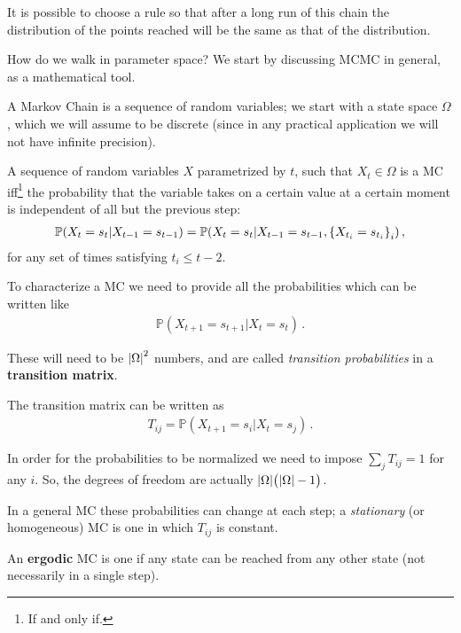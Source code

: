 \documentclass[main.tex]{subfiles}
\begin{document}
It is possible to choose a rule so that after a long run of this chain the distribution of the points reached will be the same as that of the distribution. 

How do we walk in parameter space?
We start by discussing MCMC in general, as a mathematical tool.

A Markov Chain is a sequence of random variables; 
we start with a state space \(\Omega \), which we will assume to be discrete (since in any practical application we will not have infinite precision).

A sequence of random variables \(X\) parametrized by \(t\), such that \(X_t \in \Omega \) is a MC iff\footnote{If and only if.} the probability that the variable takes on a certain value at a certain moment is independent of all but the previous step:
%
\begin{align}
\mathbb{P}(X_t = s_t | X_{t-1} = s_{t-1})
= \mathbb{P}(X_t = s_t |X_{t-1} = s_{t-1}, \qty{ X_{t_i} = s_{t_i}}_i)
\,,
\end{align}
%
for any set of times satisfying \(t_i \leq t-2\). 

To characterize a MC we need to provide all the probabilities which can be written like 
%
\begin{align}
\mathbb{P}(X_{t+1} = s_{t+1} | X_t = s_t)
\,.
\end{align}

These will need to be \(\abs{\Omega }^2\) numbers, and are called \emph{transition probabilities} in a \textbf{transition matrix}. 

The transition matrix can be written as 
%
\begin{align}
T_{ij} = \mathbb{P}(X_{t+1} = s_i | X_{t} = s_j)
\,.
\end{align}

In order for the probabilities to be normalized we need to impose \(\sum_j T_{ij} = 1\) for any \(i\).
So, the degrees of freedom are actually \(\abs{ \Omega } \qty(\abs{\Omega }-1)\).

In a general MC these probabilities can change at each step; a \emph{stationary} (or homogeneous) MC is one in which \(T_{ij}\) is constant. 

An \textbf{ergodic} MC is one if any state can be reached from any other state (not necessarily in a single step). 
\end{document}
